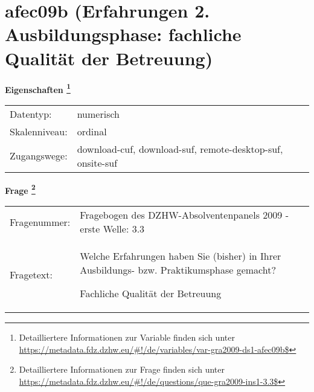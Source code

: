 
    \setcounter{footnote}{0}

    \vspace*{-1.8cm}
	\section{afec09b (Erfahrungen 2. Ausbildungsphase: fachliche Qualität der Betreuung)}
	\label{section:afec09b}



    \vspace*{0.5cm}
    \noindent\textbf{Eigenschaften
	\footnote{Detailliertere Informationen zur Variable finden sich unter
		\url{https://metadata.fdz.dzhw.eu/\#!/de/variables/var-gra2009-ds1-afec09b$}}}\\
	\begin{tabularx}{\hsize}{@{}lX}
	Datentyp: & numerisch \\
	Skalenniveau: & ordinal \\
	Zugangswege: &
	  download-cuf, 
	  download-suf, 
	  remote-desktop-suf, 
	  onsite-suf
 \\
    \end{tabularx}



				\vspace*{0.5cm}
                \noindent\textbf{Frage
	                \footnote{Detailliertere Informationen zur Frage finden sich unter
		              \url{https://metadata.fdz.dzhw.eu/\#!/de/questions/que-gra2009-ins1-3.3$}}}\\
				\begin{tabularx}{\hsize}{@{}lX}
					Fragenummer: &
					  Fragebogen des DZHW-Absolventenpanels 2009 - erste Welle:
					  3.3
 \\
					Fragetext: & Welche Erfahrungen haben Sie (bisher) in Ihrer Ausbildungs- bzw. Praktikumsphase gemacht?\par  Fachliche Qualität der Betreuung \\
				\end{tabularx}






